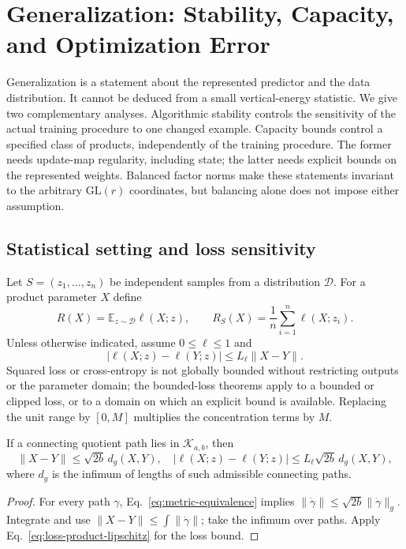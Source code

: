 \section{Generalization: Stability, Capacity, and Optimization Error}
\label{app:generalization}

Generalization is a statement about the represented predictor and the data
distribution. It cannot be deduced from a small vertical-energy statistic.
We give two complementary analyses. Algorithmic stability controls the
sensitivity of the actual training procedure to one changed example.
Capacity bounds control a specified class of products, independently of the
training procedure. The former needs update-map regularity, including state;
the latter needs explicit bounds on the represented weights. Balanced factor
norms make these statements invariant to the arbitrary $\mathrm{GL}(r)$
coordinates, but balancing alone does not impose either assumption.

\subsection{Statistical setting and loss sensitivity}
Let $S=(z_1,\ldots,z_n)$ be independent samples from a distribution
$\mathcal D$. For a product parameter $X$ define
\begin{equation}
 R(X)=\mathbb E_{z\sim\mathcal D}\ell(X;z),\qquad
 R_S(X)=\frac1n\sum_{i=1}^n\ell(X;z_i).
\end{equation}
Unless otherwise indicated, assume $0\leq\ell\leq1$ and
\begin{equation}
 |\ell(X;z)-\ell(Y;z)|\leq L_\ell\|X-Y\|.
 \label{eq:loss-product-lipschitz}
\end{equation}
Squared loss or cross-entropy is not globally bounded without restricting
outputs or the parameter domain; the bounded-loss theorems apply to a
bounded or clipped loss, or to a domain on which an explicit bound is
available. Replacing the unit range by $[0,M]$ multiplies the concentration
terms by $M$.

\begin{lemma}
\label{lem:product-sensitive}
If a connecting quotient path lies in $\mathcal K_{a,b}$, then
\begin{equation}
 \|X-Y\|\leq\sqrt{2b}\,d_g(X,Y),
 \quad |\ell(X;z)-\ell(Y;z)|
       \leq L_\ell\sqrt{2b}\,d_g(X,Y),
 \label{eq:loss-quotient-lipschitz}
\end{equation}
where $d_g$ is the infimum of lengths of such admissible connecting paths.
\end{lemma}
\begin{proof}
For every path $\gamma$, Eq.~\eqref{eq:metric-equivalence} implies
$\|\dot\gamma\|\leq\sqrt{2b}\|\dot\gamma\|_g$.
Integrate and use $\|X-Y\|\leq\int\|\dot\gamma\|$; take the infimum
over paths. Apply Eq.~\eqref{eq:loss-product-lipschitz} for the loss bound.
\end{proof}

